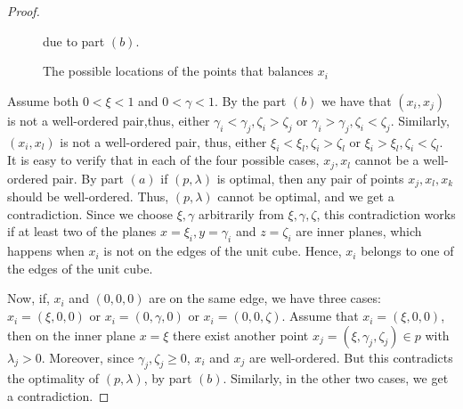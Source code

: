 \documentclass[12p]{article}
\numberwithin{equation}{section}
\begin{document}
\begin{proof}
\begin{figure}[ht]
        \caption{The possible locations of the points that balances \(x_i\)} due to part \((b)\).
        \label{fig:(c)}
\end{figure}
 
Assume both \(0<\xi<1\) and \(0<\gamma<1\). By the part \((b)\) we have that \((x_i,x_j)\) is not a well-ordered pair,thus, either \(\gamma_i< \gamma_j, \zeta_i > \zeta_j\) or \(\gamma_i> \gamma_j, \zeta_i < \zeta_j\). Similarly, \((x_i,x_l)\) is not a well-ordered pair, thus, either \(\xi_i< \xi_l, \zeta_i > \zeta_l\) or \(\xi_i> \xi_l, \zeta_i < \zeta_l\). It is easy to verify that in each of the four possible cases, \(x_j,x_l\) cannot be a well-ordered pair. By part \((a)\) if \((p,\lambda)\) is optimal, then any pair of points \(x_j,x_l,x_k\) should be well-ordered. Thus, \((p,\lambda)\) cannot be optimal, and we get a contradiction.
Since we choose \(\xi,\gamma\) arbitrarily from \(\xi,\gamma,\zeta\), this contradiction works if at least two of the planes \(x=\xi_i,y=\gamma_i\) and \(z=\zeta_i\) are inner planes, which happens when \(x_i\) is not on the edges of the unit cube.
Hence, \(x_i\) belongs to one of the edges of the unit cube. 

Now, if, \(x_i\) and \((0,0,0)\) are on the same edge, we have three cases: \(x_i=(\xi,0,0)\) or \(x_i=(0,\gamma,0)\) or \(x_i=(0,0,\zeta)\). Assume that \(x_i=(\xi,0,0)\), then on the inner plane \(x=\xi\) there exist another point \(x_j=(\xi,\gamma_j,\zeta_j) \in p\) with \(\lambda_j>0\). Moreover, since \(\gamma_j,\zeta_j \ge 0\), \(x_i\) and \(x_j\) are well-ordered. But this contradicts the optimality of \((p,\lambda)\), by part \((b)\). Similarly, in the other two cases, we get a contradiction.


\end{proof}
\end{document}
